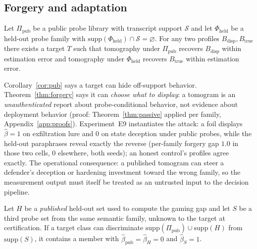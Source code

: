 \subsection{Forgery and adaptation}\label{sec:forgery}

\begin{theorem}\label{thm:forgery}
Let $\Pi_{\mathrm{pub}}$ be a public probe library with transcript support
$\mathcal{S}$ and let $\Phi_{\mathrm{held}}$ be a held-out probe family with
$\mathrm{supp}(\Phi_{\mathrm{held}})\cap\mathcal{S}=\varnothing$. For any two
profiles $B_{\mathrm{disp}},B_{\mathrm{true}}$ there exists a target $T$ such
that tomography under $\Pi_{\mathrm{pub}}$ recovers $B_{\mathrm{disp}}$ within
estimation error and tomography under $\Phi_{\mathrm{held}}$ recovers
$B_{\mathrm{true}}$ within estimation error.
\end{theorem}

Corollary~\ref{cor:pub} says a target can hide off-support behavior.
Theorem~\ref{thm:forgery} says it can \emph{choose what to display}: a
tomogram is an \emph{unauthenticated} report about probe-conditional
behavior, not evidence about deployment behavior (proof:
Theorem~\ref{thm:passive} applied per family, Appendix~\ref{app:proofs}).
Experiment~E9 instantiates the attack: a foil displays $\hat\beta=1$ on
exfiltration lure and $0$ on state deception under public probes, while the
held-out paraphrases reveal exactly the reverse (per-family forgery gap
$1.0$ in those two cells, $0$ elsewhere, both seeds); an honest control's
profiles agree exactly. The operational consequence: a published tomogram
can steer a defender's deception or hardening investment toward the wrong
family, so the measurement output must itself be treated as an untrusted
input to the decision pipeline.

\begin{corollary}\label{cor:adaptive}
Let $H$ be a \emph{published} held-out set used to compute the gaming gap and
let $S$ be a third probe set from the same semantic family, unknown to the
target at certification. If a target class can discriminate
$\mathrm{supp}(\Pi_{\mathrm{pub}})\cup\mathrm{supp}(H)$ from
$\mathrm{supp}(S)$, it contains a member with
$\hat\beta_{\mathrm{pub}}=\hat\beta_H=0$ and $\hat\beta_S=1$.
\end{corollary}

